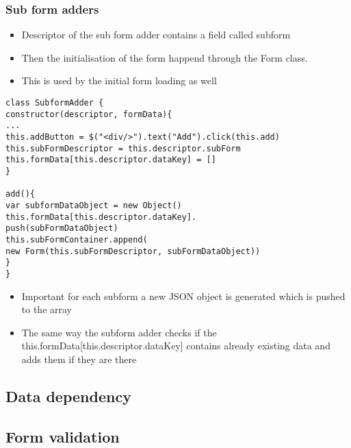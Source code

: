 \subsubsection{Sub form adders}


\begin{itemize}
	\item Descriptor of the sub form adder contains a field called subform
	\item Then the initialisation of the form happend through the Form class.	
	\item This is used by the initial form loading as well
\end{itemize}

\begin{lstlisting}[basicstyle=\footnotesize, frame=single, caption={Sub form adder routine}, captionpos=b]
class SubformAdder {
constructor(descriptor, formData){
...
this.addButton = $("<div/>").text("Add").click(this.add)    
this.subFormDescriptor = this.descriptor.subForm
this.formData[this.descriptor.dataKey] = []
}

add(){
var subformDataObject = new Object()
this.formData[this.descriptor.dataKey].
push(subFormDataObject) 
this.subFormContainer.append(
new Form(this.subFormDescriptor, subFormDataObject))
}
}
\end{lstlisting}

\begin{itemize}
	\item Important for each subform a new JSON object is generated which is pushed to the array		
	\item The same way the subform adder checks if the this.formData[this.descriptor.dataKey] contains already existing data and adds them if they are there
\end{itemize}

\subsection{Data dependency}

\subsection{Form validation}

